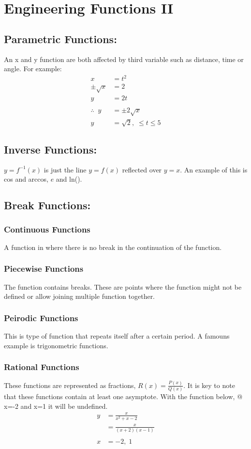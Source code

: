 \documentclass[a5paper]{article}
\begin{document}
	\pagebreak

	\section{Engineering Functions II}
	\subsection{Parametric Functions:}
	An x and y function are both affected by third variable such as distance, time or angle. For example:
	\begin{align*}
		x&=t^{2}\\
		\pm\sqrt{x}&=2\\
		y&=2t\\\\
		\therefore\;\;y&=\pm 2\sqrt{x}\\
		y&=\sqrt{2},\;\leq t\leq 5
	\end{align*}
	\subsection{Inverse Functions:}
	$y=f^{-1}(x)$ is just the line $y=f(x)$ reflected over $y=x$. An example of this is cos and arccos, $e$ and ln().

	\subsection{Break Functions:}
	\subsubsection{Continuous Functions}
	A function in where there is no break in the continuation of the function.
	\subsubsection{Piecewise Functions}
	The function contains breaks. These are points where the function might not be defined or allow joining multiple function together.
	\subsubsection{Peirodic Functions}
	This is type of function that repeats itself after a certain period. A famouns example is trigonometric functions.
	\subsubsection{Rational Functions}
	These functions are represented as fractions, $R(x)=\frac{P(x)}{Q(x)}$. It is key to note that these functions contain at least one asymptote. With the function below, @ x=-2 and x=1 it will be undefined.
	\begin{align*}
		y&=\frac{x}{x^{2}+x-2}\\
		 &=\frac{x}{(x+2)(x-1)}\\\\
		x&=-2,\;1
	\end{align*}
\end{document}
